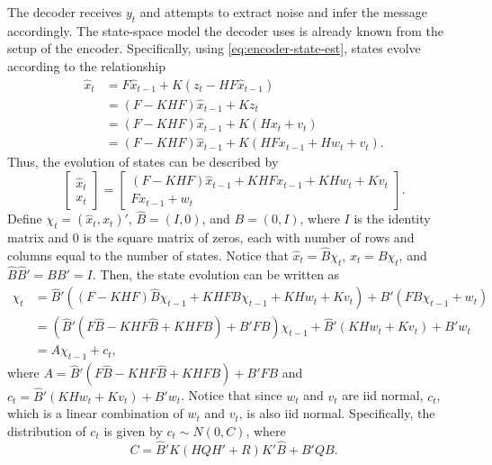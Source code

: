 \documentclass{article}
\begin{document}
The decoder receives $y_t$ and attempts to extract noise and infer the message accordingly. The state-space model the decoder uses is already known from the setup of the encoder. Specifically, using \cref{eq:encoder-state-est}, states evolve according to the relationship
\begin{subequations}
\begin{align}
	\hat{x}_t &= F \hat{x}_{t-1} + K(z_t - H F \hat{x}_{t-1}) \\
	&= (F - KHF)\hat{x}_{t-1} + K z_t \\
	&= (F - KHF)\hat{x}_{t-1} + K (H x_t + v_t) \\
	&= (F - KHF)\hat{x}_{t-1} + K (H F x_{t-1} + H w_t + v_t).
\end{align}
\end{subequations}
Thus, the evolution of states can be described by
\begin{equation}
	\left[\begin{array}{c}\hat{x}_t \\ x_t \end{array}\right] = \left[\begin{array}{c} (F - K H F)\hat{x}_{t-1} + K H F x_{t-1} + K H w_t + K v_t \\ F x_{t-1} + w_t\end{array}\right].
\end{equation}
Define $\chi_t = (\hat{x}_t, x_t)'$, $\hat{B} = (I, 0)$, and $B = (0, I)$, where $I$ is the identity matrix and $0$ is the square matrix of zeros, each with number of rows and columns equal to the number of states. Notice that $\hat{x}_t = \hat{B}\chi_t$, $x_t = B\chi_t$, and $\hat{B} \hat{B}' = B B' = I$. Then, the state evolution can be written as
\begin{subequations}
\begin{align}
	\chi_t &= \hat{B}'((F - K H F)\hat{B}\chi_{t-1} +  K H F B \chi_{t-1} + K H w_t + K v_t) + B'(F B \chi_{t-1} + w_t) \\
	&= (\hat{B}'(F \hat{B} - K H F \hat{B} + K H F B) + B' F B)\chi_{t-1} + \hat{B}'(K H w_t + K v_t) + B' w_t \\
	&= A \chi_{t-1} + c_t,
\end{align}
\end{subequations}
where $A = \hat{B}'(F \hat{B} - K H F \hat{B} + K H F B) + B' F B$ and $c_t = \hat{B}'(K H w_t + K v_t) + B' w_t$. Notice that since $w_t$ and $v_t$ are iid normal, $c_t$, which is a linear combination of $w_t$ and $v_t$, is also iid normal. Specifically, the distribution of $c_t$ is given by $c_t\sim N(0, C)$, where
\begin{equation}
	C = \hat{B}' K (H Q H' + R) K' \hat{B} + B' Q B.
\end{equation}
\end{document}
